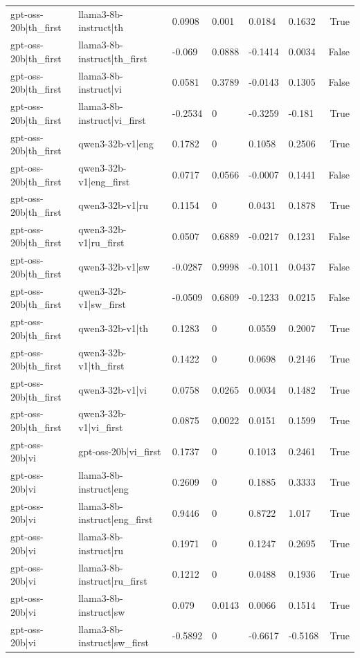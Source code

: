 \begin{table}
\begin{tabular}{llllllr}
gpt-oss-20b|th_first & llama3-8b-instruct|th & 0.0908 & 0.001 & 0.0184 & 0.1632 & True \\
gpt-oss-20b|th_first & llama3-8b-instruct|th_first & -0.069 & 0.0888 & -0.1414 & 0.0034 & False \\
gpt-oss-20b|th_first & llama3-8b-instruct|vi & 0.0581 & 0.3789 & -0.0143 & 0.1305 & False \\
gpt-oss-20b|th_first & llama3-8b-instruct|vi_first & -0.2534 & 0 & -0.3259 & -0.181 & True \\
gpt-oss-20b|th_first & qwen3-32b-v1|eng & 0.1782 & 0 & 0.1058 & 0.2506 & True \\
gpt-oss-20b|th_first & qwen3-32b-v1|eng_first & 0.0717 & 0.0566 & -0.0007 & 0.1441 & False \\
gpt-oss-20b|th_first & qwen3-32b-v1|ru & 0.1154 & 0 & 0.0431 & 0.1878 & True \\
gpt-oss-20b|th_first & qwen3-32b-v1|ru_first & 0.0507 & 0.6889 & -0.0217 & 0.1231 & False \\
gpt-oss-20b|th_first & qwen3-32b-v1|sw & -0.0287 & 0.9998 & -0.1011 & 0.0437 & False \\
gpt-oss-20b|th_first & qwen3-32b-v1|sw_first & -0.0509 & 0.6809 & -0.1233 & 0.0215 & False \\
gpt-oss-20b|th_first & qwen3-32b-v1|th & 0.1283 & 0 & 0.0559 & 0.2007 & True \\
gpt-oss-20b|th_first & qwen3-32b-v1|th_first & 0.1422 & 0 & 0.0698 & 0.2146 & True \\
gpt-oss-20b|th_first & qwen3-32b-v1|vi & 0.0758 & 0.0265 & 0.0034 & 0.1482 & True \\
gpt-oss-20b|th_first & qwen3-32b-v1|vi_first & 0.0875 & 0.0022 & 0.0151 & 0.1599 & True \\
gpt-oss-20b|vi & gpt-oss-20b|vi_first & 0.1737 & 0 & 0.1013 & 0.2461 & True \\
gpt-oss-20b|vi & llama3-8b-instruct|eng & 0.2609 & 0 & 0.1885 & 0.3333 & True \\
gpt-oss-20b|vi & llama3-8b-instruct|eng_first & 0.9446 & 0 & 0.8722 & 1.017 & True \\
gpt-oss-20b|vi & llama3-8b-instruct|ru & 0.1971 & 0 & 0.1247 & 0.2695 & True \\
gpt-oss-20b|vi & llama3-8b-instruct|ru_first & 0.1212 & 0 & 0.0488 & 0.1936 & True \\
gpt-oss-20b|vi & llama3-8b-instruct|sw & 0.079 & 0.0143 & 0.0066 & 0.1514 & True \\
gpt-oss-20b|vi & llama3-8b-instruct|sw_first & -0.5892 & 0 & -0.6617 & -0.5168 & True \\

\end{tabular}
\end{table}
